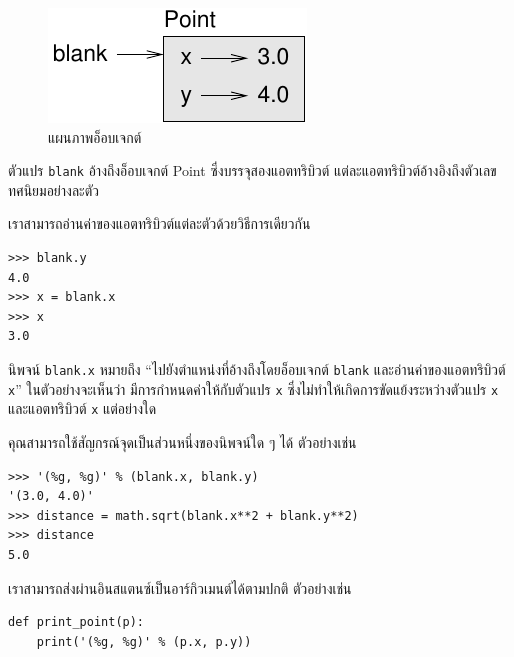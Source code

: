 \begin{figure}
\centerline
{\includegraphics[scale=0.8]{figs/point.pdf}}
\caption{แผนภาพอ็อบเจกต์}
\label{fig.point}
\end{figure}


ตัวแปร {\tt blank} อ้างถึงอ็อบเจกต์ Point ซึ่งบรรจุสองแอตทริบิวต์ แต่ละแอตทริบิวต์อ้างอิงถึงตัวเลขทศนิยมอย่างละตัว

เราสามารถอ่านค่าของแอตทริบิวต์แต่ละตัวด้วยวิธีการเดียวกัน

\begin{verbatim}
>>> blank.y
4.0
>>> x = blank.x
>>> x
3.0
\end{verbatim}
%

นิพจน์ {\tt blank.x} หมายถึง ``ไปยังตำแหน่งที่อ้างถึงโดยอ็อบเจกต์ {\tt blank} และอ่านค่าของแอตทริบิวต์ {\tt x}'' 
ในตัวอย่างจะเห็นว่า มีการกำหนดค่าให้กับตัวแปร {\tt x} ซึ่งไม่ทำให้เกิดการขัดแย้งระหว่างตัวแปร {\tt x} และแอตทริบิวต์ {\tt x} แต่อย่างใด

คุณสามารถใช้สัญกรณ์จุดเป็นส่วนหนึ่งของนิพจน์ใด ๆ ได้ ตัวอย่างเช่น

\begin{verbatim}
>>> '(%g, %g)' % (blank.x, blank.y)
'(3.0, 4.0)'
>>> distance = math.sqrt(blank.x**2 + blank.y**2)
>>> distance
5.0
\end{verbatim}
%
เราสามารถส่งผ่านอินสแตนซ์เป็นอาร์กิวเมนต์ได้ตามปกติ ตัวอย่างเช่น

\begin{verbatim}
def print_point(p):
    print('(%g, %g)' % (p.x, p.y))
\end{verbatim}
%

